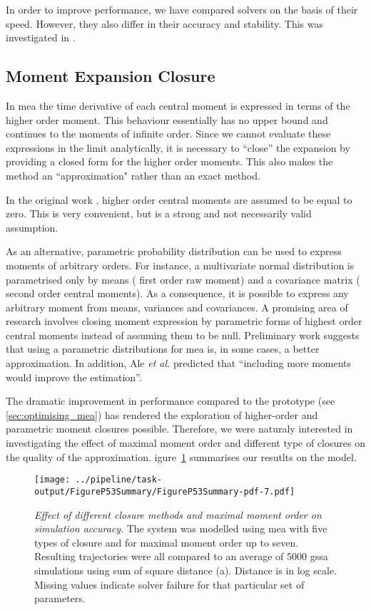 In order to improve performance, we have compared solvers on the basis of their speed.
However, they also differ in their accuracy and stability.
This was investigated in  .

\subsection{Moment Expansion Closure}

In \gls{mea} the time derivative of each central moment is expressed in terms of the higher order moment. 
This behaviour essentially has no upper bound and continues to the moments of infinite order. 
Since we cannot evaluate these expressions in the limit analytically, it is necessary to ``close'' the expansion by providing a closed form for the higher order moments.
This also makes the method an ``approximation" rather than an exact method.

In the original work \cite{ale_general_2013}, higher order central moments are assumed to be equal to zero.
This is very convenient, but is a strong and not necessarily valid assumption. 

As an alternative, parametric probability distribution can be used to express moments of arbitrary orders. 
For instance, a multivariate normal distribution is parametrised only by means (\ie{} first order raw moment)
and a covariance matrix (\ie{} second order central moments). 
As a consequence, it is possible to express any arbitrary moment from means, variances and covariances. 
A promising area of research involves closing moment expression by parametric forms of highest order central moments instead
of assuming them to be null.
Preliminary work \cite{lakatos_preparation_2014} suggests that using a parametric distributions for \gls{mea} is, in some cases, a better approximation.
In addition, Ale \emph{et al.} predicted that ``including more moments would improve the estimation''\cite{ale_general_2013}.

The dramatic improvement in performance compared to the \mat{} prototype (see \autoref{sec:optimising_mea}) has rendered the exploration of higher-order and parametric moment closures possible.
Therefore, we were naturaly interested in investigating the effect of maximal moment order and different type of closures on the quality of the approximation.
igure~\ref{fig:max_order_and_closure_on_distance_summary} summarises our resutlts on the \pft{} model.

\begin{figure}[t]
    \centering
    \texttt{[image: ../pipeline/task-output/FigureP53Summary/FigureP53Summary-pdf-7.pdf]}
    \caption{\emph{Effect of different closure methods and maximal moment order on simulation accuracy}. The \pft system was modelled using \gls{mea} with five types of closure and for maximal moment order up to seven.
Resulting trajectories were all compared to an average of 5000 \gls{gssa} simulations using sum of square distance (a).
Distance is in log scale. Missing values indicate solver failure for that particular set of parameters.}
    \label{fig:max_order_and_closure_on_distance_summary}
\end{figure}


